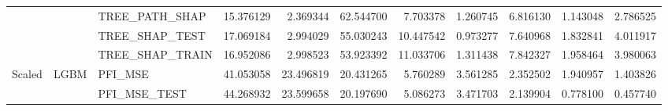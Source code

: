 \begin{table}
\begin{tabular}{lllrrrrrrrr}
 &  & TREE\_PATH\_SHAP & {\cellcolor[HTML]{86A9FC}} \color[HTML]{F1F1F1} 15.376129 & {\cellcolor[HTML]{4055C8}} \color[HTML]{F1F1F1} 2.369344 & {\cellcolor[HTML]{B40426}} \color[HTML]{F1F1F1} 62.544700 & {\cellcolor[HTML]{5B7AE5}} \color[HTML]{F1F1F1} 7.703378 & {\cellcolor[HTML]{3B4CC0}} \color[HTML]{F1F1F1} 1.260745 & {\cellcolor[HTML]{5673E0}} \color[HTML]{F1F1F1} 6.816130 & {\cellcolor[HTML]{3B4CC0}} \color[HTML]{F1F1F1} 1.143048 & {\cellcolor[HTML]{4257C9}} \color[HTML]{F1F1F1} 2.786525 \\
 &  & TREE\_SHAP\_TEST & {\cellcolor[HTML]{9EBEFF}} \color[HTML]{000000} 17.069184 & {\cellcolor[HTML]{455CCE}} \color[HTML]{F1F1F1} 2.994029 & {\cellcolor[HTML]{B40426}} \color[HTML]{F1F1F1} 55.030243 & {\cellcolor[HTML]{7295F4}} \color[HTML]{F1F1F1} 10.447542 & {\cellcolor[HTML]{3B4CC0}} \color[HTML]{F1F1F1} 0.973277 & {\cellcolor[HTML]{6180E9}} \color[HTML]{F1F1F1} 7.640968 & {\cellcolor[HTML]{3F53C6}} \color[HTML]{F1F1F1} 1.832841 & {\cellcolor[HTML]{4B64D5}} \color[HTML]{F1F1F1} 4.011917 \\
 &  & TREE\_SHAP\_TRAIN & {\cellcolor[HTML]{9EBEFF}} \color[HTML]{000000} 16.952086 & {\cellcolor[HTML]{445ACC}} \color[HTML]{F1F1F1} 2.998523 & {\cellcolor[HTML]{B40426}} \color[HTML]{F1F1F1} 53.923392 & {\cellcolor[HTML]{7699F6}} \color[HTML]{F1F1F1} 11.033706 & {\cellcolor[HTML]{3B4CC0}} \color[HTML]{F1F1F1} 1.311438 & {\cellcolor[HTML]{6180E9}} \color[HTML]{F1F1F1} 7.842327 & {\cellcolor[HTML]{3E51C5}} \color[HTML]{F1F1F1} 1.958464 & {\cellcolor[HTML]{4961D2}} \color[HTML]{F1F1F1} 3.980063 \\
\cline{1-11} \cline{2-11}
\multirow[c]{17}{*}{Scaled} & \multirow[c]{9}{*}{LGBM} & PFI\_MSE & {\cellcolor[HTML]{B40426}} \color[HTML]{F1F1F1} 41.053058 & {\cellcolor[HTML]{EAD4C8}} \color[HTML]{000000} 23.496819 & {\cellcolor[HTML]{D7DCE3}} \color[HTML]{000000} 20.431265 & {\cellcolor[HTML]{5D7CE6}} \color[HTML]{F1F1F1} 5.760289 & {\cellcolor[HTML]{4A63D3}} \color[HTML]{F1F1F1} 3.561285 & {\cellcolor[HTML]{4257C9}} \color[HTML]{F1F1F1} 2.352502 & {\cellcolor[HTML]{3E51C5}} \color[HTML]{F1F1F1} 1.940957 & {\cellcolor[HTML]{3B4CC0}} \color[HTML]{F1F1F1} 1.403826 \\
 &  & PFI\_MSE\_TEST & {\cellcolor[HTML]{B40426}} \color[HTML]{F1F1F1} 44.268932 & {\cellcolor[HTML]{E4D9D2}} \color[HTML]{000000} 23.599658 & {\cellcolor[HTML]{CFDAEA}} \color[HTML]{000000} 20.197690 & {\cellcolor[HTML]{5B7AE5}} \color[HTML]{F1F1F1} 5.086273 & {\cellcolor[HTML]{4F69D9}} \color[HTML]{F1F1F1} 3.471703 & {\cellcolor[HTML]{455CCE}} \color[HTML]{F1F1F1} 2.139904 & {\cellcolor[HTML]{3C4EC2}} \color[HTML]{F1F1F1} 0.778100 & {\cellcolor[HTML]{3B4CC0}} \color[HTML]{F1F1F1} 0.457740 \\

\end{tabular}
\end{table}

